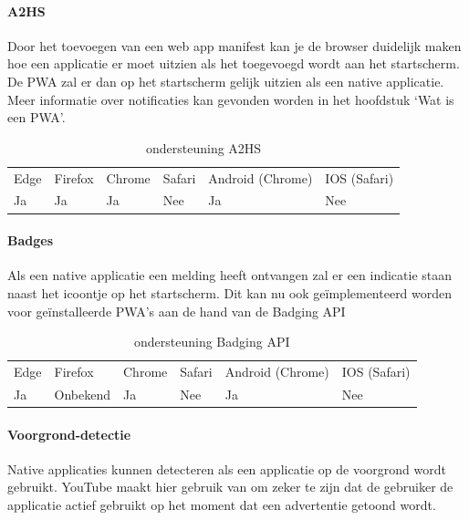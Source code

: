 \paragraph{A2HS}


 Door het toevoegen van een web app manifest kan je de browser duidelijk maken hoe een applicatie er moet uitzien als het toegevoegd wordt aan het startscherm. De PWA zal er dan op het startscherm gelijk uitzien als een native applicatie.
Meer informatie over notificaties kan gevonden worden in het hoofdstuk ‘Wat is een PWA’.


\begin{table}[H]
	\centering
	\begin{tabular}{llllll}
		Edge & Firefox & Chrome & Safari & Android (Chrome) & IOS (Safari) \\
		Ja   & Ja      &  Ja     & Nee     & Ja               & Nee          
	\end{tabular}	
	\caption{ondersteuning A2HS }
	\label{ondersteuning A2HS}
\end{table}


\paragraph{Badges}

Als een native applicatie een melding heeft ontvangen zal er een indicatie staan naast het icoontje op het startscherm. Dit kan nu ook geïmplementeerd worden voor geïnstalleerde PWA’s aan de hand van de Badging API \autocite{LePage2020a}

\begin{table}[H]
	\centering
	\begin{tabular}{llllll}
		Edge & Firefox & Chrome & Safari & Android (Chrome) & IOS (Safari) \\
		Ja   & Onbekend      &  Ja     & Nee     & Ja               & Nee          
	\end{tabular}	
	\caption{ondersteuning Badging API }
	\label{ondersteuning Badging API}
\end{table}

\paragraph{Voorgrond-detectie }

Native applicaties kunnen detecteren als een applicatie op de voorgrond wordt gebruikt. YouTube maakt hier gebruik van om zeker te zijn dat de gebruiker de applicatie actief gebruikt op het moment dat een advertentie getoond wordt.

